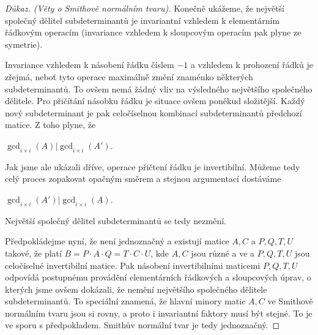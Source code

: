 \begin{proof}[Důkaz. (Věty o Smithově normálním tvaru)]
Konečně ukážeme, že největší společný dělitel subdeterminantů je invariantní
vzhledem k elementárním řádkovým operacím (invariance vzhledem k sloupcovým
operacím pak plyne ze symetrie).

Invariance vzhledem k násobení řádku číslem $ -1 $ a vzhledem k prohození řádků
je zřejmá, neboť tyto operace maximálně změní znaménko některých subdeterminantů.
To ovšem nemá žádný vliv na výsledného největšího společného dělitele. Pro přičítání
násobku řádku je situace ovšem poněkud složitější. Každý nový subdeterminant je
pak celočíselnou kombinací subdeterminantů předchozí matice. Z toho plyne, že
\begin{center}
$ \gcd_{i \times i }(A) \vert \gcd_{i \times i }(A') $.
\end{center}

Jak jsme ale ukázali dříve, operace přičtení řádku je invertibilní. Můžeme tedy
celý proces zopakovat opačným směrem a stejnou argumentací dostáváme
\begin{center}
$ \gcd_{i \times i }(A') \vert \gcd_{i \times i }(A) $.
\end{center}
Největší společný dělitel subdeterminantů se tedy nezmění.

Předpokládejme nyní, že \snf{} není jednoznačný a existují matice $ A,C $ a $ P,Q,T,U$
takové, že platí $ B = P \cdot A \cdot Q = T \cdot C \cdot U $, kde $ A,C $ jsou
různé a ve \snf{} a $ P,Q,T,U$ jsou celočíselné invertibilní matice. Pak násobení
invertibilními maticemi $ P,Q,T,U$ odpovídá postupnému provádění elementárních
řádkových a sloupcových úprav, o kterých jsme ovšem dokázali, že nemění největšího
společného dělitele subdeterminantů. To speciální znamená, že hlavní minory matic
$ A,C $ ve Smithově normálním tvaru jsou si rovny, a proto i invariantní faktory
musí být stejné. To je ve sporu s předpokladem. Smithův normální tvar je tedy
jednoznačný.

\end{proof}